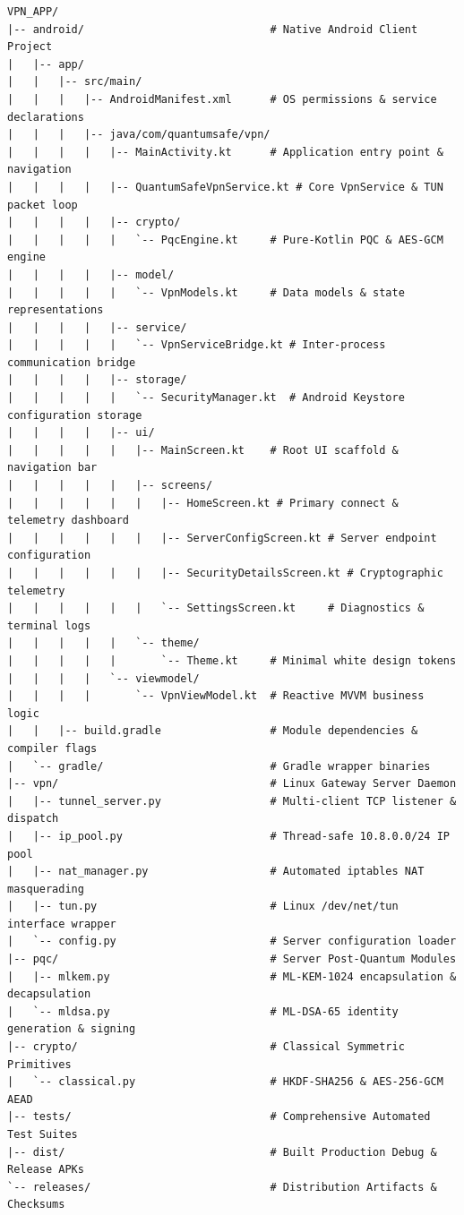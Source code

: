 \begin{lstlisting}[basicstyle=\ttfamily\scriptsize, caption={Repository Directory Structure.}]
VPN_APP/
|-- android/                             # Native Android Client Project
|   |-- app/
|   |   |-- src/main/
|   |   |   |-- AndroidManifest.xml      # OS permissions & service declarations
|   |   |   |-- java/com/quantumsafe/vpn/
|   |   |   |   |-- MainActivity.kt      # Application entry point & navigation
|   |   |   |   |-- QuantumSafeVpnService.kt # Core VpnService & TUN packet loop
|   |   |   |   |-- crypto/
|   |   |   |   |   `-- PqcEngine.kt     # Pure-Kotlin PQC & AES-GCM engine
|   |   |   |   |-- model/
|   |   |   |   |   `-- VpnModels.kt     # Data models & state representations
|   |   |   |   |-- service/
|   |   |   |   |   `-- VpnServiceBridge.kt # Inter-process communication bridge
|   |   |   |   |-- storage/
|   |   |   |   |   `-- SecurityManager.kt  # Android Keystore configuration storage
|   |   |   |   |-- ui/
|   |   |   |   |   |-- MainScreen.kt    # Root UI scaffold & navigation bar
|   |   |   |   |   |-- screens/
|   |   |   |   |   |   |-- HomeScreen.kt # Primary connect & telemetry dashboard
|   |   |   |   |   |   |-- ServerConfigScreen.kt # Server endpoint configuration
|   |   |   |   |   |   |-- SecurityDetailsScreen.kt # Cryptographic telemetry
|   |   |   |   |   |   `-- SettingsScreen.kt     # Diagnostics & terminal logs
|   |   |   |   |   `-- theme/
|   |   |   |   |       `-- Theme.kt     # Minimal white design tokens
|   |   |   |   `-- viewmodel/
|   |   |   |       `-- VpnViewModel.kt  # Reactive MVVM business logic
|   |   |-- build.gradle                 # Module dependencies & compiler flags
|   `-- gradle/                          # Gradle wrapper binaries
|-- vpn/                                 # Linux Gateway Server Daemon
|   |-- tunnel_server.py                 # Multi-client TCP listener & dispatch
|   |-- ip_pool.py                       # Thread-safe 10.8.0.0/24 IP pool
|   |-- nat_manager.py                   # Automated iptables NAT masquerading
|   |-- tun.py                           # Linux /dev/net/tun interface wrapper
|   `-- config.py                        # Server configuration loader
|-- pqc/                                 # Server Post-Quantum Modules
|   |-- mlkem.py                         # ML-KEM-1024 encapsulation & decapsulation
|   `-- mldsa.py                         # ML-DSA-65 identity generation & signing
|-- crypto/                              # Classical Symmetric Primitives
|   `-- classical.py                     # HKDF-SHA256 & AES-256-GCM AEAD
|-- tests/                               # Comprehensive Automated Test Suites
|-- dist/                                # Built Production Debug & Release APKs
`-- releases/                            # Distribution Artifacts & Checksums
\end{lstlisting}


